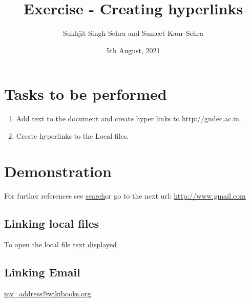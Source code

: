 \documentclass[a4paper,12pt,twoside]{article}
\title{Exercise - Creating hyperlinks}
\author{Sukhjit Singh Sehra and Sumeet Kaur Sehra}
\date{5th August, 2021}
\begin{document}
	\maketitle	
\section*{Tasks to be performed}
\begin{enumerate}	
\item Add text to the document and create hyper links to http://gndec.ac.in.
\item Create hyperlinks to the Local files.
\end{enumerate}
	
\section*{Demonstration}
For further references see \href{http://www.google.com}{search}or go to the next url: \url{http://www.gmail.com} 

\subsection*{Linking local files}
To open the local file \href{run:file.txt}{text displayed}
\subsection{Linking Email}
\href{mailto:my_address@wikibooks.org}{my\_address@wikibooks.org}
		
 
\end{document}
